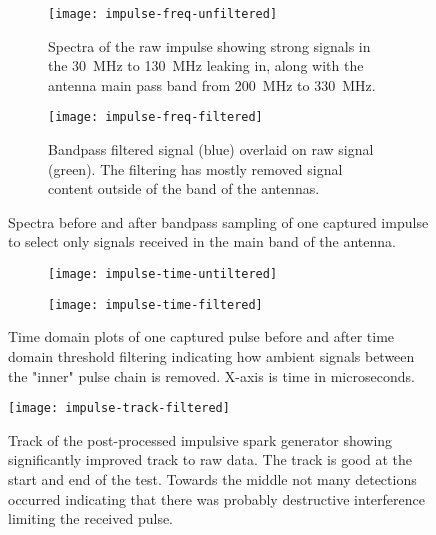 \begin{figure}
  \centering
  \begin{subfigure}[b]{0.8\textwidth}
    \centering
    \texttt{[image: impulse-freq-unfiltered]}
    \caption{Spectra of the raw impulse showing strong signals in the \SI{30}{\mega\hertz} to \SI{130}{\mega\hertz} leaking in, along with the antenna main pass band from \SI{200}{\mega\hertz} to \SI{330}{\mega\hertz}.}
  \end{subfigure}
  \begin{subfigure}[b]{0.8\textwidth}
    \centering
    \texttt{[image: impulse-freq-filtered]}
    \caption{Bandpass filtered signal (blue) overlaid on raw signal (green). The filtering has mostly removed signal content outside of the band of the antennas.}
  \end{subfigure}
  \caption{Spectra before and after bandpass sampling of one captured impulse to select only signals received in the main band of the antenna.}
  \label{fig:field-trials:impulse-source-freq-filtering}
\end{figure}

\begin{figure}
  \centering
  \begin{subfigure}[b]{0.8\textwidth}
    \centering
    \texttt{[image: impulse-time-untiltered]}
  \end{subfigure}
  \begin{subfigure}[b]{0.8\textwidth}
    \centering
    \texttt{[image: impulse-time-filtered]}
  \end{subfigure}
  \caption{Time domain plots of one captured pulse before and after time domain threshold filtering indicating how ambient signals between the "inner" pulse chain is removed. X-axis is time in microseconds.}
  \label{fig:field-trials:impulse-source-time-filtering}
\end{figure}

\begin{figure}
  \centering
  \texttt{[image: impulse-track-filtered]}
  \caption{Track of the post-processed impulsive spark generator showing significantly improved track to raw data. The track is good at the start and end of the test. Towards the middle not many detections occurred indicating that there was probably destructive interference limiting the received pulse.}
  \label{fig:field-trails:impulse-source-final-track}
\end{figure}
